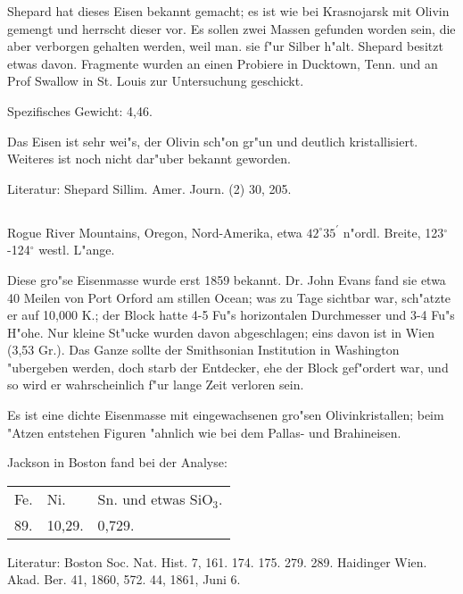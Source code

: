 \documentclass[a4paper, 11pt, oneside]{article}
\begin{document}
Shepard hat dieses Eisen bekannt gemacht; es ist wie bei Krasnojarsk mit Olivin gemengt und herrscht dieser vor. Es sollen zwei Massen gefunden worden sein, die aber verborgen gehalten werden, weil man. sie f"ur Silber h"alt. Shepard besitzt etwas davon. Fragmente wurden an einen Probiere in Ducktown, Tenn. und an Prof Swallow in St. Louis zur Untersuchung geschickt.

Spezifisches Gewicht: 4,46.

Das Eisen ist sehr wei"s, der Olivin sch"on gr"un und deutlich kristallisiert. Weiteres ist noch nicht dar"uber bekannt geworden.

\normalsize
Literatur: Shepard Sillim. Amer. Journ. (2) 30, 205.

\subsection{}
\LARGE
\paragraph{}
Rogue River Mountains, Oregon, Nord-Amerika, etwa $42^\circ 35^\prime$ n"ordl. Breite, 123$^\circ$-124$^\circ$ westl. L"ange.

Diese gro"se Eisenmasse wurde erst 1859 bekannt. Dr. John Evans fand sie etwa 40 Meilen von Port Orford am stillen Ocean; was zu Tage sichtbar war, sch"atzte er auf 10,000 K.; der Block hatte 4-5 Fu"s horizontalen Durchmesser und 3-4 Fu"s H"ohe. Nur kleine St"ucke wurden davon abgeschlagen; eins davon ist in Wien (3,53 Gr.). Das Ganze sollte der Smithsonian Institution in Washington "ubergeben werden, doch starb der Entdecker, ehe der Block gef"ordert war, und so wird er wahrscheinlich f"ur lange Zeit verloren sein.

Es ist eine dichte Eisenmasse mit eingewachsenen gro"sen Olivinkristallen; beim "Atzen entstehen Figuren "ahnlich wie bei dem Pallas- und Brahineisen.

Jackson in Boston fand bei der Analyse:
\begin{table}[H]
    \centering\swabfamily\Large
    \begin{tabular}{l l l}
        Fe. & Ni. & Sn. und etwas SiO$_{3}$.  \\
        89. & 10,29. & 0,729. \\
    \end{tabular}
\end{table}

\normalsize
Literatur: Boston Soc. Nat. Hist. 7, 161. 174. 175. 279. 289. Haidinger Wien. Akad. Ber. 41, 1860, 572. 44, 1861, Juni 6.
\end{document}
